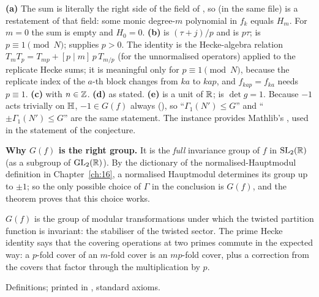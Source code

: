 \begin{dictionary}
\textbf{(a)} The sum is literally the right side of the field  of , so
 (in the same file) is a restatement of that field: some monic degree-$m$
polynomial in $f_k$ equals $H_m$.  For $m=0$ the sum is empty and $H_0=0$.  \textbf{(b)}  is
$(\tau+j)/p$ and  is $p\tau$;  is $p\equiv1\pmod N$;  supplies $p>0$.  The
identity is the Hecke-algebra relation $T_mT_p=T_{mp}+[p\mid m]\,p\,T_{m/p}$ (for the unnormalised operators) applied to the
replicate Hecke sums; it is meaningful only for $p\equiv1\pmod N$, because the replicate index of the $a$-th block changes from
$ka$ to $kap$, and $f_{kap}=f_{ka}$ needs $p\equiv1$.  \textbf{(c)}  with $n\in{\mathbb{Z}}$.  \textbf{(d)} as
stated.  \textbf{(e)}  is a unit of $\mathbb{R}$;  is $\det g=1$.  Because $-1$ acts trivially on
$\mathbb{H}$, $-1\in G(f)$ always (), so ``$\Gamma_1(N')\le G$'' and ``$\pm\Gamma_1(N')\le G$'' are the
same statement.  The instance  provides Mathlib's , used in the statement of
the conjecture.

\textbf{Why $G(f)$ is the right group.}  It is the \emph{full} invariance group of $f$ in $\mathrm{SL}_2(\mathbb{R})$ (as a subgroup of
$\mathrm{GL}_2(\mathbb{R})$).  By the dictionary of the normalised-Hauptmodul definition in Chapter~\ref{ch:16}, a normalised Hauptmodul
determines its group up to $\pm1$; so the only possible choice of $\Gamma$ in the conclusion is $G(f)$, and the theorem
proves that this choice works.
\end{dictionary}
\begin{physics}
$G(f)$ is the group of modular transformations under which the twisted partition function is invariant: the stabiliser of
the twisted sector.  The prime Hecke identity says that the covering operations at two primes commute in the expected way:
a $p$-fold cover of an $m$-fold cover is an $mp$-fold cover, plus a correction from the covers that factor through the
multiplication by $p$.
\end{physics}
\begin{status}Definitions; printed in , standard axioms.\end{status}

